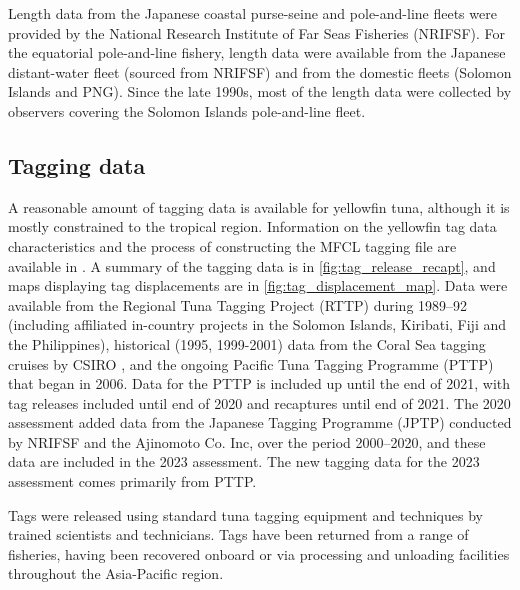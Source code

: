 Length data from the Japanese coastal purse-seine and pole-and-line fleets were provided by the National Research Institute of Far Seas Fisheries (NRIFSF). For the equatorial pole-and-line fishery, length data were available from the Japanese distant-water fleet (sourced from NRIFSF) and from the domestic fleets (Solomon Islands and PNG). Since the late 1990s, most of the length data were collected by observers covering the Solomon Islands pole-and-line fleet.

\subsection{Tagging data}
\label{sec:tag_data}

A reasonable amount of tagging data is available for yellowfin tuna, although it is mostly constrained to the tropical region. Information on the yellowfin tag data characteristics and the process of constructing the MFCL tagging file are available in \citet{peatman_analysis_2023-1,teears_cpue_2023}. A summary of the tagging data is in \autoref{fig:tag_release_recapt}, and maps displaying tag displacements are in \autoref{fig:tag_displacement_map}. Data were available from the Regional Tuna Tagging Project (RTTP) during 1989--92 (including affiliated in-country projects in the Solomon Islands, Kiribati, Fiji and the Philippines), historical (1995, 1999-2001) data from the Coral Sea tagging cruises by CSIRO \citep{evans_behaviour_2008}, and the ongoing Pacific Tuna Tagging Programme (PTTP) that began in 2006. Data for the PTTP is included up until the end of 2021, with tag releases included until end of 2020 and recaptures until end of 2021. The 2020 assessment added data from the Japanese Tagging Programme (JPTP) conducted by NRIFSF and the Ajinomoto Co. Inc, over the period 2000--2020, and these data are included in the 2023 assessment. The new tagging data for the 2023 assessment comes primarily from PTTP.

Tags were released using standard tuna tagging equipment and techniques by trained scientists and technicians. Tags have been returned from a range of fisheries, having been recovered onboard or via processing and unloading facilities throughout the Asia-Pacific region.

